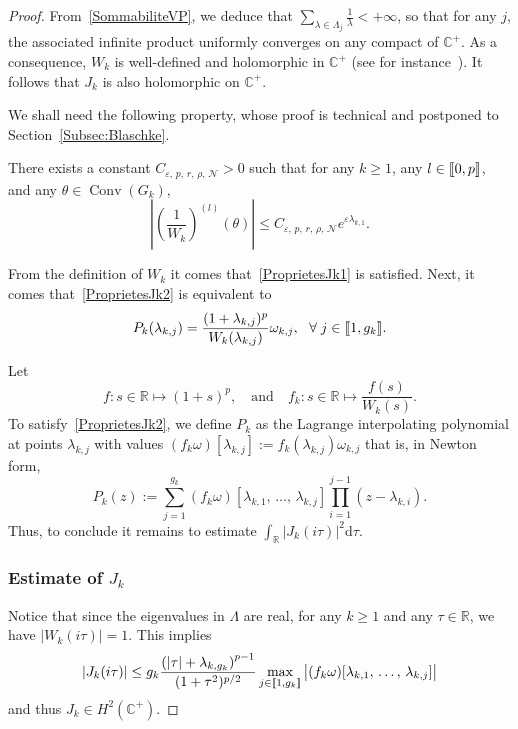 \documentclass[10pt]{amsart}
\theoremstyle{definition}\newtheorem{defi}[theo]{Definition}\newtheorem{rema}[theo]{Remark}\newtheorem{exam}[theo]{Example}\newtheorem{exem}[theo]{Example}\newtheorem{nota}[theo]{Notation}
\DeclareMathOperator{\Conv}{Conv}
\newcommand{\llbracket}{\mathopen{[\mkern -2.7mu[}}
\newcommand{\rrbracket}{\mathclose{]\mkern -2.7mu]}}
\newcommand{\inter}[2]{\llbracket #1,#2 \rrbracket}
\newcommand{\n}{g}
\newcommand{\NN}{\mathcal{N}}
\newcommand{\R}{\mathbb{R}}
\newcommand{\C}{\mathbb{C}}
\newcommand{\md}{\mathrm{d}}
\let\oldforall\forall
\renewcommand*{\forall}{\mathrel{\oldforall}}
\begin{document}
\begin{proof}
From~\eqref{SommabiliteVP}, we deduce that $\sum_{\lambda\in \Lambda_j}\frac{1}{\lambda}<+\infty$, so that for any $j$, the associated infinite product uniformly converges on any compact of $\C^+$. As a consequence, $W_k$ is well-defined and holomorphic in $\C^+$ (see for instance~\cite[Chapter~15]{RudinAnalyseComplexe}). It follows that $J_k$ is also holomorphic on $\C^+$.

We shall need the following property, whose proof is technical and postponed to Section~\ref{Subsec:Blaschke}.

\begin{prop}\label{Proposition:Blaschke}
There exists a constant $C_{\varepsilon,\,p,\,r,\,\rho,\,\NN}>0$ such that for any $k\geq 1$, any $l \in \inter{0}{p}$, and any $\theta\in \Conv (G_k)$,
\begin{equation}\label{EstimeeFinaleBlaschke}
\left| \left(\frac{1}{W_k} \right)^{(l)}(\theta) \right| \leq C_{\varepsilon,\,p,\,r,\, \rho,\,\NN} e^{\varepsilon \lambda_{k,1}}.
\end{equation}
\end{prop}

From the definition of $W_k$ it comes that~\eqref{ProprietesJk1} is satisfied. Next, it comes that~\eqref{ProprietesJk2} is equivalent to
\[
P_k(\lambda_{k,j}) = \frac{(1+\lambda_{k,j})^p}{W_k(\lambda_{k,j})} \omega_{k,j}, \ \ \forall j\in \inter{1}{\n_k}.
\]

Let
\[
f : s \in \R \mapsto (1+s)^p,
\quad \text{and} \quad f_k : s \in \R \mapsto \frac{f(s)}{W_k(s)}.
\]
To satisfy~\eqref{ProprietesJk2}, we define $P_k$ as the Lagrange interpolating polynomial at points $\lambda_{k,j}$ with values $(f_k \omega)[\lambda_{k,j}]:=f_k(\lambda_{k,j}) \omega_{k,j}$ that is, in Newton form,
\begin{equation*}\label{Def:Pk}
P_k(z) := \sum_{j=1}^{\n_k} (f_k \omega) [\lambda_{k,1},\,\dots,\,\lambda_{k,j}] \prod_{i=1}^{j-1} (z-\lambda_{k,i}).
\end{equation*}
Thus, to conclude it remains to estimate $\displaystyle \int_\R |J_k(i \tau)|^2 \md \tau$.


\subsubsection{Estimate of $J_k$}

Notice that since the eigenvalues in $\Lambda$ are real, for any $k \geq 1$ and any $\tau \in \R$, we have $|W_k(i \tau)|=1$. This implies
\begin{equation}\label{Estimee_Jk_intermediaire}
|J_k(i \tau)| \leq \n_k \frac{\left(|\tau|+\lambda_{k,\n_k}\right)^{p-1}}{(1+\tau^2)^{p/2}} \max_{j\in \inter{1}{\n_k}} \big| (f_k \omega) [\lambda_{k,1},\,\dots,\, \lambda_{k,j}] \big|
\end{equation}
and thus $J_k \in H^2(\C^+)$.



\end{proof}
\end{document}
